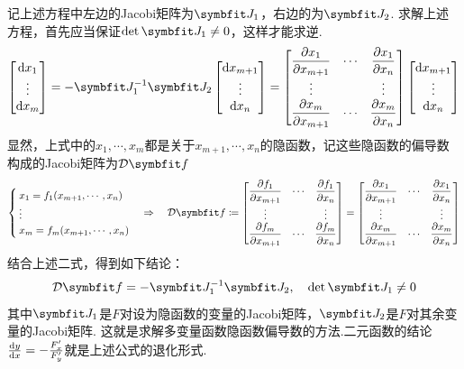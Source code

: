 记上述方程中左边的Jacobi矩阵为$\vb{J}_1$，右边的为$\vb{J}_2$.
求解上述方程，首先应当保证$\det \vb{J}_1 \neq 0$，这样才能求逆.
\begin{gather*}
    \begin{bmatrix}
        \dd{x_1} \\ \vdots \\ \dd{x_m}
    \end{bmatrix} = -\vb{J}_1^{-1} \vb{J}_2 \begin{bmatrix}
        \dd{x_{m+1}} \\ \vdots \\ \dd{x_n}
    \end{bmatrix} = \begin{bmatrix}
    \displaystyle\pdv{x_1}{x_{m+1}} & \cdots & \displaystyle\pdv{x_1}{x_n} \\
    \vdots & & \vdots \\
    \displaystyle\pdv{x_m}{x_{m+1}} & \cdots & \displaystyle\pdv{x_m}{x_n} \\
\end{bmatrix} \begin{bmatrix}
        \dd{x_{m+1}} \\ \vdots \\ \dd{x_n}
    \end{bmatrix}
\end{gather*}
显然，上式中的$x_1,\cdots,x_m$都是关于$x_{m+1},\cdots,x_n$的隐函数，记这些隐函数的偏导数构成的Jacobi矩阵为$\mathcal{D}\vb{f}$
\[\begin{cases}
    x_1 = f_1(x_{m+1},\cdots,x_n) \\
    \vdots \\
    x_m = f_m(x_{m+1},\cdots,x_n) \\
\end{cases} \Rightarrow\quad \mathcal{D}\vb{f} \coloneq \begin{bmatrix}
    \displaystyle\pdv{f_1}{x_{m+1}} & \cdots & \displaystyle\pdv{f_1}{x_n} \\
    \vdots & & \vdots \\
    \displaystyle\pdv{f_m}{x_{m+1}} & \cdots & \displaystyle\pdv{f_m}{x_n} \\
\end{bmatrix} = \begin{bmatrix}
    \displaystyle\pdv{x_1}{x_{m+1}} & \cdots & \displaystyle\pdv{x_1}{x_n} \\
    \vdots & & \vdots \\
    \displaystyle\pdv{x_m}{x_{m+1}} & \cdots & \displaystyle\pdv{x_m}{x_n} \\
\end{bmatrix}\]
结合上述二式，得到如下结论：
\[\mathcal{D}\vb{f} = -\vb{J}_1^{-1}\vb{J}_2,\quad \det \vb{J}_1 \neq 0\]
其中$\vb{J}_1$是$F$对设为隐函数的变量的Jacobi矩阵，$\vb{J}_2$是$F$对其余变量的Jacobi矩阵.
这就是求解多变量函数隐函数偏导数的方法.二元函数的结论$\dv{y}{x} = -\frac{F'_x}{F'_y}$就是上述公式的退化形式.


